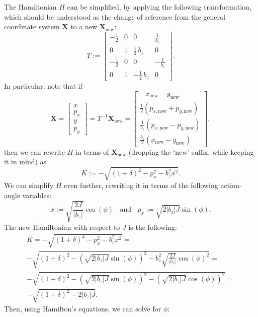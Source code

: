 The Hamiltonian $H$ can be simplified, by applying the following transformation, which should be understood as the change of reference from the general coordinate system $\mathbf{X}$ to a new $\mathbf{X}_\text{new}$:
\[
  T := \begin{bmatrix}
  -\frac{1}{2} & 0 & 0 & \frac{1}{b_{z}} \\
  0 & 1 & \frac{1}{2} \, b_{z} & 0 \\
  -\frac{1}{2} & 0 & 0 & -\frac{1}{b_{z}} \\
  0 & 1 & -\frac{1}{2} \, b_{z} & 0
  \end{bmatrix}.
\]
In particular, note that if
\[
  \mathbf{X} =
  \begin{bmatrix}
    x \\ p_x \\ y \\ p_y
  \end{bmatrix}
  = T^{-1} \mathbf{X}_\text{new}
  = \begin{bmatrix}
    -x_\text{new} - y_\text{new} \\
    \frac{1}{2}(p_{x,\text{new}} + p_{y,\text{new}}) \\
    \frac{1}{b_z}(p_{x,\text{new}} - p_{y,\text{new}}) \\
    \frac{b_z}{2} (x_\text{new} - y_\text{new})
  \end{bmatrix},
\]
then we can rewrite $H$ in terms of $\mathbf{X}_\text{new}$ (dropping the `new' suffix, while keeping it in mind) as
\[
  K := -\sqrt{(1 + \delta)^2 - p_x^2 - b_z^2 x^2}.
\]
We can simplify $H$ even further, rewriting it in terms of the following action-angle variables:
\begin{equation}\label{eq:solenoid-x-px}
  x := \sqrt{\frac{2 J}{|b_z|}} \cos(\phi)
  \;\;\text{ and }\;\;
  p_x := \sqrt{2 |b_z| J} \sin(\phi).
\end{equation}
The new Hamiltonian with respect to $J$ is the following:
\begin{multline*}
  K = -\sqrt{(1 + \delta)^2 - p_x^2 - b_z^2 x^2} = \\
  -\sqrt{(1 + \delta)^2 - \left(\sqrt{2 |b_z| J} \sin(\phi)\right)^2 - b_z^2 \sqrt{\frac{2 J}{|b_z|}} \cos(\phi)^2} = \\
  -\sqrt{(1 + \delta)^2 - \left(\sqrt{2 |b_z| J} \sin(\phi)\right)^2 - \left(\sqrt{2 |b_z| J} \cos(\phi)\right)^2} = \\
  -\sqrt{(1 + \delta)^2 - 2 |b_z| J}.
\end{multline*}
Then, using Hamilton's equations, we can solve for $\phi$:
